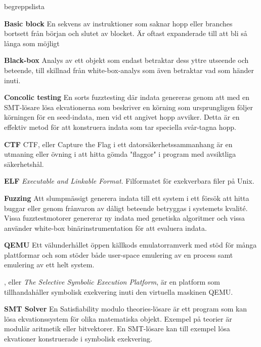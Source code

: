 \begin{labeling}{begreppslista}

  \item[\textbf{Basic block}] En sekvens av instruktioner som saknar
      hopp eller branches bortsett från början och slutet av
      blocket. Är oftast expanderade till att bli så långa som möjligt

  \item [\textbf{Black-box}] Analys av ett objekt som endast betraktar dess
      yttre utseende och beteende, till skillnad från white-box-analys som även
      betraktar vad som händer inuti.

  \item [\textbf{Concolic testing}] En sorts fuzztesting där indata genereras
      genom att med en SMT-lösare lösa ekvationerna som beskriver en körning som
      ursprungligen följer körningen för en seed-indata, men vid ett angivet
      hopp avviker. Detta är en effektiv metod för att konstruera indata som tar
      speciella svår-tagna hopp.

  \item [\textbf{CTF}] CTF, eller Capture the Flag i ett
    datorsäkerhetssammanhang är en utmaning eller övning i
    att hitta gömda "flaggor" i program med avsiktliga säkerhetshål.

  \item [\textbf{ELF}] \emph{Executable and Linkable Format}. Filformatet för
      exekverbara filer på Unix.

  \item [\textbf{Fuzzing}] Att slumpmässigt generera indata till ett system i
      ett försök att hitta buggar eller genom frånvaron av dåligt beteende
      betryggas i systemets kvalité. Vissa fuzztestmotorer genererar ny indata
      med genetiska algoritmer och vissa använder white-box binärinstrumentation
      för att evaluera indata.

  \item [\textbf{QEMU}] Ett välunderhållet öppen källkods emulatorramverk med stöd
    för många plattformar och som stöder både user-space emulering av en process
    samt emulering av ett helt system.

  \item [\textbf{\stoe}] \stoe, eller \emph{The Selective Symbolic Execution Platform}, är
      en platform som tillhandahåller symbolisk exekvering inuti den virtuella
      maskinen QEMU.

  \item [\textbf{SMT Solver}] En Satisfiability modulo theories-lösare är ett
      program som kan lösa ekvationssystem för olika matematiska objekt. Exempel
      på teorier är modulär aritmetik eller bitvektorer. En SMT-lösare kan till
      exempel lösa ekvationer konstruerade i symbolisk exekvering.


\end{labeling}
